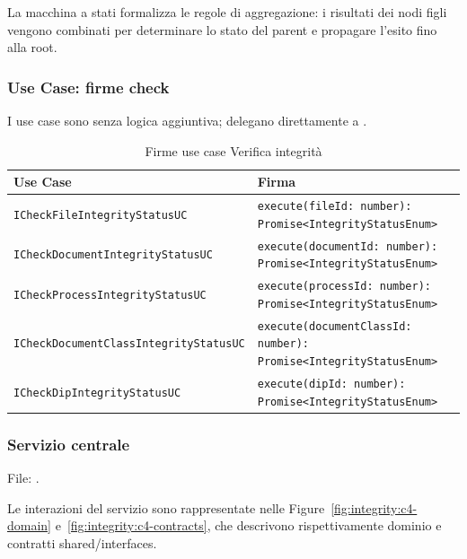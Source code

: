 \noindent
La macchina a stati formalizza le regole di aggregazione: i risultati dei nodi figli vengono combinati per determinare lo stato del parent e propagare l'esito fino alla root.

\subsubsection{Use Case: firme check}
\label{sec:integrity:usecase}

\noindent
I use case sono  senza logica aggiuntiva; delegano direttamente a .

\begin{table}[H]
	\centering
	\footnotesize
	\setlength{\tabcolsep}{4pt}
	\renewcommand{\arraystretch}{1.4}
	\begin{tabularx}{\textwidth}{|l|Y|}
		\hline
		\textbf{Use Case} & \textbf{Firma} \\
		\hline
		\texttt{ICheckFileIntegrityStatusUC} & \texttt{execute(fileId: number): Promise<IntegrityStatusEnum>} \\
		\hline
		\texttt{ICheckDocumentIntegrityStatusUC} & \texttt{execute(documentId: number): Promise<IntegrityStatusEnum>} \\
		\hline
		\texttt{ICheckProcessIntegrityStatusUC} & \texttt{execute(processId: number): Promise<IntegrityStatusEnum>} \\
		\hline
		\texttt{ICheckDocumentClassIntegrityStatusUC} & \texttt{execute(documentClassId: number): Promise<IntegrityStatusEnum>} \\
		\hline
		\texttt{ICheckDipIntegrityStatusUC} & \texttt{execute(dipId: number): Promise<IntegrityStatusEnum>} \\
		\hline
	\end{tabularx}
	\caption{Firme use case Verifica integrità}
	\label{tab:integrity:usecase}
\end{table}

\subsubsection{Servizio centrale}
\label{sec:integrity:service}

\noindent
File: .

\noindent
Le interazioni del servizio sono rappresentate nelle Figure~\ref{fig:integrity:c4-domain} e~\ref{fig:integrity:c4-contracts}, che descrivono rispettivamente dominio e contratti shared/interfaces.

